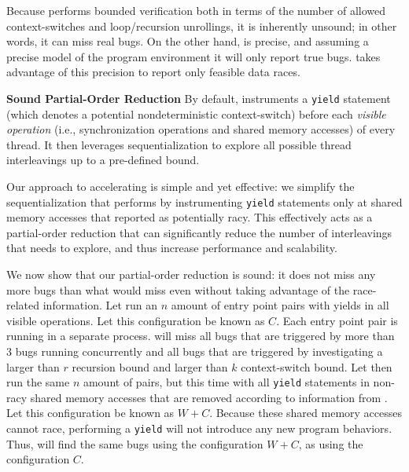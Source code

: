 {Because \corral performs bounded verification both in terms of the number of allowed context-switches and loop/recursion unrollings, it is inherently unsound; in other words, it can miss real bugs. On the other hand, \corral is precise, and assuming a precise model of the program environment it will only report true bugs. \whoop takes advantage of this precision to report only feasible data races.

\noindent
\textbf{Sound Partial-Order Reduction}\xspace\xspace By default, \corral instruments a \texttt{yield} statement (which denotes a potential nondeterministic context-switch) before each \emph{visible operation} (i.e., synchronization operations and shared memory accesses) of every thread. It then leverages sequentialization to explore all possible thread interleavings up to a pre-defined bound.

Our approach to accelerating \corral is simple and yet effective: we simplify
the sequentialization that \corral performs by instrumenting \texttt{yield}
statements only at shared memory accesses that \whoop reported as potentially
racy. This effectively acts as a partial-order reduction that can significantly
reduce the number of interleavings that \corral needs to explore, and thus
increase performance and scalability.

We now show that our partial-order reduction is sound: it does not miss any more
bugs than what \corral would miss even without taking advantage of the \whoop
race-related information. Let \corral run an $n$ amount of entry point pairs
with yields in all visible operations. Let this configuration be known as $C$.
Each entry point pair is running in a separate \corral process. \corral will
miss all bugs that are triggered by more than 3 bugs running concurrently and
all bugs that are triggered by investigating a larger than $r$ recursion bound
and larger than $k$ context-switch bound. Let \corral then run the same $n$
amount of pairs, but this time with all \texttt{yield} statements in non-racy
shared memory accesses that are removed according to information from \whoop. Let this configuration be
known as $W+C$. Because these shared memory accesses cannot race, performing a
\texttt{yield} will not introduce any new program behaviors. Thus, \corral will
find the same bugs using the configuration $W+C$, as using the configuration
$C$.

}
